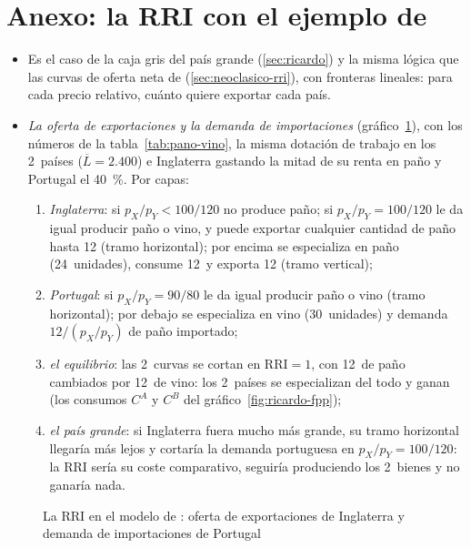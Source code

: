\documentclass[11pt]{article}
\begin{document}
\section{Anexo: la RRI con el ejemplo de }\label{anexo:ricardo-rri}

\begin{itemize}
\item Es el caso de la caja gris del país grande (\ref{sec:ricardo}) y la misma lógica que las curvas de oferta neta de  (\ref{sec:neoclasico-rri}), con fronteras lineales: para cada precio relativo, cuánto quiere exportar cada país.
\item \emph{La oferta de exportaciones y la demanda de importaciones} (gráfico~\ref{fig:ricardo-oferta-exportacion}), con los números de la tabla~\ref{tab:pano-vino}, la misma dotación de trabajo en los 2~países ($\overline L=2.400$) e Inglaterra gastando la mitad de su renta en paño y Portugal el 40~\%. Por capas:
  \begin{enumerate}
  \item \emph{Inglaterra}: si $p_X/p_Y<100/120$ no produce paño; si $p_X/p_Y=100/120$ le da igual producir paño o vino, y puede exportar cualquier cantidad de paño hasta 12 (tramo horizontal); por encima se especializa en paño (24~unidades), consume 12~y exporta 12 (tramo vertical);
  \item \emph{Portugal}: si $p_X/p_Y=90/80$ le da igual producir paño o vino (tramo horizontal); por debajo se especializa en vino (30~unidades) y demanda $12/(p_X/p_Y)$ de paño importado;
  \item \emph{el equilibrio}: las 2~curvas se cortan en $\mathrm{RRI}=1$, con 12~de paño cambiados por 12~de vino: los 2~países se especializan del todo y ganan (los consumos $C^A$ y $C^B$ del gráfico~\ref{fig:ricardo-fpp});
  \item \emph{el país grande}: si Inglaterra fuera mucho más grande, su tramo horizontal llegaría más lejos y cortaría la demanda portuguesa en $p_X/p_Y=100/120$: la RRI sería su coste comparativo, seguiría produciendo los 2~bienes y no ganaría nada.
  \end{enumerate}
\end{itemize}
\begin{figure}[H]
\centering
\caption{La RRI en el modelo de : oferta de exportaciones de Inglaterra y demanda de importaciones de Portugal}\label{fig:ricardo-oferta-exportacion}
\end{figure}
\end{document}
